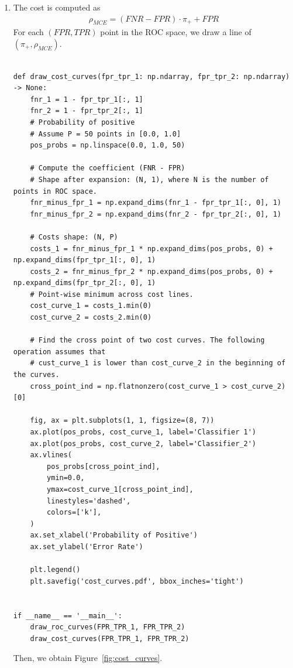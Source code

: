 \documentclass[a4paper]{article}
\begin{document}
{\begin{enumerate}
\item The cost is computed as 
\begin{align*}
    \rho_{MCE} = (FNR - FPR) \cdot \pi_{+} + FPR
\end{align*}
For each $(FPR, TPR)$ point in the ROC space, we draw a line of $(\pi_{+}, \rho_{MCE})$.

\begin{lstlisting}

def draw_cost_curves(fpr_tpr_1: np.ndarray, fpr_tpr_2: np.ndarray) -> None:
    fnr_1 = 1 - fpr_tpr_1[:, 1]
    fnr_2 = 1 - fpr_tpr_2[:, 1]
    # Probability of positive
    # Assume P = 50 points in [0.0, 1.0]
    pos_probs = np.linspace(0.0, 1.0, 50)

    # Compute the coefficient (FNR - FPR)
    # Shape after expansion: (N, 1), where N is the number of points in ROC space.
    fnr_minus_fpr_1 = np.expand_dims(fnr_1 - fpr_tpr_1[:, 0], 1)
    fnr_minus_fpr_2 = np.expand_dims(fnr_2 - fpr_tpr_2[:, 0], 1)

    # Costs shape: (N, P)
    costs_1 = fnr_minus_fpr_1 * np.expand_dims(pos_probs, 0) + np.expand_dims(fpr_tpr_1[:, 0], 1)
    costs_2 = fnr_minus_fpr_2 * np.expand_dims(pos_probs, 0) + np.expand_dims(fpr_tpr_2[:, 0], 1)
    # Point-wise minimum across cost lines.
    cost_curve_1 = costs_1.min(0)
    cost_curve_2 = costs_2.min(0)

    # Find the cross point of two cost curves. The following operation assumes that
    # cust_curve_1 is lower than cost_curve_2 in the beginning of the curves.
    cross_point_ind = np.flatnonzero(cost_curve_1 > cost_curve_2)[0]

    fig, ax = plt.subplots(1, 1, figsize=(8, 7))
    ax.plot(pos_probs, cost_curve_1, label='Classifier 1')
    ax.plot(pos_probs, cost_curve_2, label='Classifier_2')
    ax.vlines(
        pos_probs[cross_point_ind],
        ymin=0.0,
        ymax=cost_curve_1[cross_point_ind],
        linestyles='dashed',
        colors=['k'],
    )
    ax.set_xlabel('Probability of Positive')
    ax.set_ylabel('Error Rate')

    plt.legend()
    plt.savefig('cost_curves.pdf', bbox_inches='tight')


if __name__ == '__main__':
    draw_roc_curves(FPR_TPR_1, FPR_TPR_2)
    draw_cost_curves(FPR_TPR_1, FPR_TPR_2)

\end{lstlisting}
Then, we obtain Figure~\ref{fig:cost_curves}.


\end{enumerate}}
\end{document}
